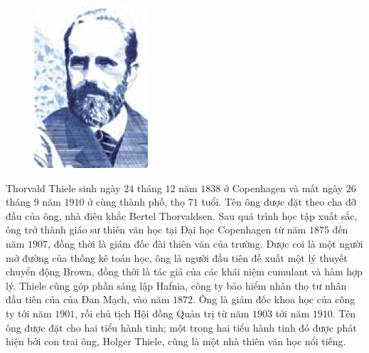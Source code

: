 \begin{multicols}{2}
\begin{tBox}
\begin{figure}
			\hspace*{3pt}\includegraphics[width= 1.1\linewidth]{Thiele.png}
			\vspace*{-20pt}
		\end{figure}
		Thorvald Thiele sinh ngày $24$ tháng $12$ năm $1838$ ở Copenhagen và mất ngày $26$ tháng $9$ năm $1910$ ở cùng thành phố, thọ $71$ tuổi. Tên ông được đặt theo cha đỡ đầu của ông, nhà điêu khắc Bertel Thorvaldsen. Sau quá trình học tập xuất sắc, ông trở thành giáo sư thiên văn học tại Đại học Copenhagen từ năm $1875$ đến năm $1907$, đồng thời là giám đốc đài thiên văn của trường. Được coi là một người mở đường của thống kê toán học, ông là người đầu tiên đề xuất một lý thuyết chuyển động Brown, đồng thời là tác giả của các khái niệm cumulant và hàm hợp lý. Thiele cũng góp phần sáng lập Hafnia, công ty bảo hiểm nhân thọ tư nhân đầu tiên của của Đan Mạch, vào năm $1872$. Ông là giám đốc khoa học của công ty tới năm $1901$, rồi chủ tịch Hội đồng Quản trị từ năm $1903$ tới năm $1910$. Tên ông được đặt cho hai tiểu hành tinh; một trong  hai tiểu hành tinh đó được phát hiện bởi con trai ông, Holger Thiele, cũng là một nhà thiên văn học nổi tiếng.

\end{tBox}
\end{multicols}
